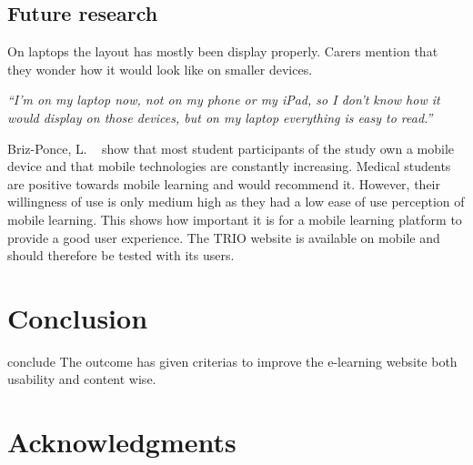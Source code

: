 \documentclass{sigchi}
\begin{document}
\subsection{Future research}
On laptops the layout has mostly been display properly. Carers mention that they wonder how it would look like on smaller devices. 

\textit{“I’m on my laptop now, not on my phone or my iPad, so I don’t know how it would display on those devices, but on my laptop everything is easy to read.”}

Briz-Ponce, L. ~\cite{Briz-Ponce2017} show that most student participants of the study own a mobile device and that mobile technologies are constantly increasing. Medical students are positive towards mobile learning and would recommend it. However, their willingness of use is only medium high as they had a low ease of use perception of mobile learning. This shows how important it is for a mobile learning platform to provide a good user experience. The TRIO website is available on mobile and should therefore be tested with its users. 

\section{Conclusion}
conclude
The outcome has given criterias to improve the e-learning website both usability and content wise.
 
\section{Acknowledgments}

\balance{}



\end{document}

